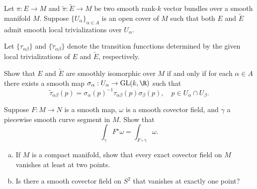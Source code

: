 \documentclass[12pt]{pset}
\DeclareMathOperator{\GL}{GL}
\begin{document}
\begin{problem}[Lee 5--5]

Let $\pi : E \to M$ and $\tilde{\pi} : \tilde{E} \to M$ be two smooth
rank-$k$ vector bundles over a smooth manifold $M$.  Suppose $\{
U_\alpha \}_{\alpha \in A}$ is an open cover of $M$ such that both $E$
and $\tilde{E}$ admit smooth local trivializations over $U_\alpha$.

Let $\{ \tau_{\alpha \beta} \}$ and $\{ \tilde{\tau}_{\alpha \beta}
\}$ denote the transition funcctions determined by the given local
trivializations of $E$ and $\tilde{E}$, respectively.

Show that $E$ and $\tilde{E}$ are smoothly isomorphic over $M$ if and
only if for each $\alpha \in A$ there exists a smooth map
$\sigma_\alpha : U_\alpha \to \GL(k,\R)$ such that
$$
\tilde{\tau}_{\alpha \beta}(p) = \sigma_\alpha(p)^{-1} \tau_{\alpha
  \beta}(p) \sigma_\beta(p), \hspace{1em} p \in U_\alpha \cap U_\beta.
$$

\end{problem}

\begin{problem}[Lee 6--9]

Suppose $F : M \to N$ is a smooth map, $\omega$ is a smooth covector
field, and $\gamma$ a piecewise smooth curve segment in $M$.  Show
that
$$
\int_{\gamma} F^\star \omega = \int_{F \circ \gamma} \omega.
$$

\end{problem}

\begin{problem}[Lee 6--13]

\begin{enumerate}[(a)]
\item If $M$ is a compact manifold, show that every exact covector
  field on $M$ vanishes at least at two points.
\item Is there a smooth covector field on $S^2$ that vanishes at
  exactly one point?
\end{enumerate}
\end{problem}
\end{document}
